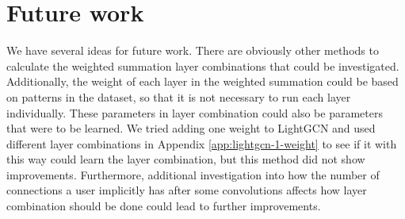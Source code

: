 \section{Future work}
We have several ideas for future work.
There are obviously other methods to calculate the weighted summation layer combinations that could be investigated.
Additionally, the weight of each layer in the weighted summation could be based on patterns in the dataset, so that it is not necessary to run each layer individually.
These parameters in layer combination could also be parameters that were to be learned.
We tried adding one weight to LightGCN and used different layer combinations in Appendix \ref{app:lightgcn-1-weight} to see if it with this way could learn the layer combination, but this method did not show improvements.
Furthermore, additional investigation into how the number of connections a user implicitly has after some convolutions affects how layer combination should be done could lead to further improvements.



